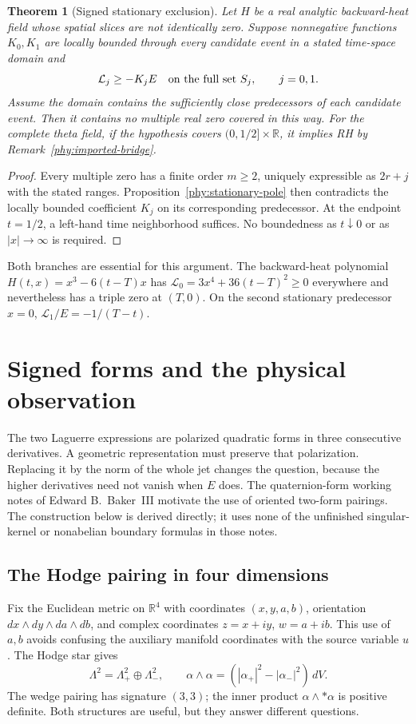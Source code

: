 \documentclass[11pt]{article}
\numberwithin{equation}{section}
\newtheorem{theorem}{Theorem}[section]
\theoremstyle{definition}
\theoremstyle{remark}
\begin{document}
\begin{theorem}[Signed stationary exclusion]
\label{phy:stationary-exclusion}
Let $H$ be a real analytic backward-heat field whose spatial slices are
not identically zero.  Suppose nonnegative functions $K_0,K_1$ are locally
bounded through every candidate event in a stated time-space domain and
\begin{equation}
 \mathcal L_j\ge-K_jE\quad\hbox{on the full set }S_j,\qquad j=0,1.
 \label{phy:stationary-target}
\end{equation}
Assume the domain contains the sufficiently close predecessors of each
candidate event.  Then it contains no multiple real zero covered in this
way.  For the complete theta field, if the hypothesis covers
$(0,1/2]\times\mathbb R$, it implies RH by
Remark~\ref{phy:imported-bridge}.
\end{theorem}
\begin{proof}
Every multiple zero has a finite order $m\ge2$, uniquely expressible as
$2r+j$ with the stated ranges.  Proposition~\ref{phy:stationary-pole}
then contradicts the locally bounded coefficient $K_j$ on its corresponding
predecessor.  At the endpoint $t=1/2$, a left-hand time neighborhood
suffices.  No boundedness as $t\downarrow0$ or as $|x|\to\infty$ is required.
\end{proof}

Both branches are essential for this argument.  The backward-heat polynomial
$H(t,x)=x^3-6(t-T)x$ has
$\mathcal L_0=3x^4+36(t-T)^2\ge0$ everywhere and nevertheless has a
triple zero at $(T,0)$.  On the second stationary predecessor $x=0$,
$\mathcal L_1/E=-1/(T-t)$.

\section{Signed forms and the physical observation}\label{forms:section}

The two Laguerre expressions are polarized quadratic forms in three
consecutive derivatives.  A geometric representation must preserve that
polarization.  Replacing it by the norm of the whole jet changes the
question, because the higher derivatives need not vanish when $E$ does.
The quaternion-form working notes of Edward B.~Baker~III
\cite{BakerQuaternion} motivate the use of oriented two-form pairings.
The construction below is derived directly; it uses none of the
unfinished singular-kernel or nonabelian boundary formulas in those notes.

\subsection{The Hodge pairing in four dimensions}
Fix the Euclidean metric on $\mathbb R^4$ with coordinates $(x,y,a,b)$,
orientation $dx\wedge dy\wedge da\wedge db$, and complex coordinates
$z=x+iy$, $w=a+ib$.  This use of $a,b$ avoids confusing the auxiliary
manifold coordinates with the source variable $u$.  The Hodge star gives
\[
 \Lambda^2=\Lambda^2_+\oplus\Lambda^2_-,\qquad
 \alpha\wedge\alpha=(|\alpha_+|^2-|\alpha_-|^2)\,dV.
\]
The wedge pairing has signature $(3,3)$; the inner product
$\alpha\wedge *\alpha$ is positive definite.  Both structures are useful,
but they answer different questions.
\end{document}
